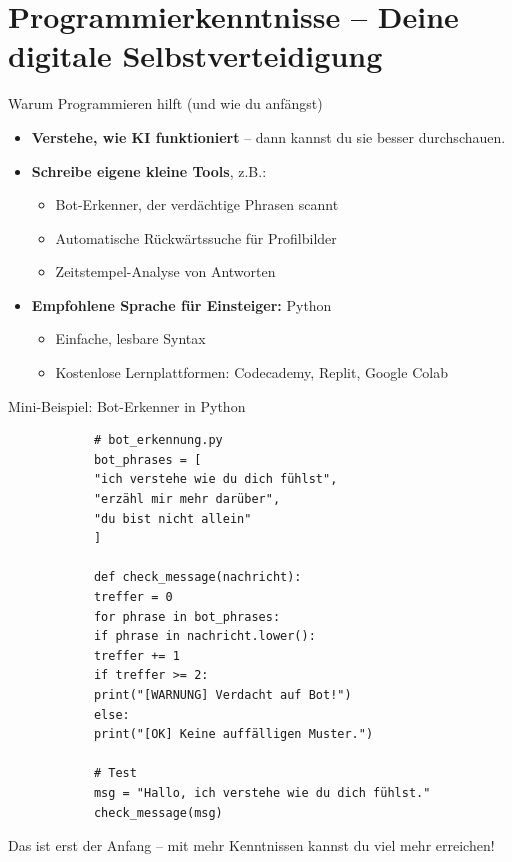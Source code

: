 \documentclass[10pt,aspectratio=169]{beamer}
\begin{document}
	\section{Programmierkenntnisse – Deine digitale Selbstverteidigung}
	\begin{frame}{Warum Programmieren hilft (und wie du anfängst)}
		\begin{itemize}
			\item \textbf{Verstehe, wie KI funktioniert} – dann kannst du sie besser durchschauen.
			\item \textbf{Schreibe eigene kleine Tools}, z.B.:
			\begin{itemize}
				\item Bot-Erkenner, der verdächtige Phrasen scannt
				\item Automatische Rückwärtssuche für Profilbilder
				\item Zeitstempel-Analyse von Antworten
			\end{itemize}
			\item \textbf{Empfohlene Sprache für Einsteiger:} \alert{Python}
			\begin{itemize}
				\item Einfache, lesbare Syntax
				\item Kostenlose Lernplattformen: Codecademy, Replit, Google Colab
			\end{itemize}
		\end{itemize}
	\end{frame}
	
	\begin{frame}[fragile]{Mini-Beispiel: Bot-Erkenner in Python}
		\begin{verbatim}
			# bot_erkennung.py
			bot_phrases = [
			"ich verstehe wie du dich fühlst",
			"erzähl mir mehr darüber",
			"du bist nicht allein"
			]
			
			def check_message(nachricht):
			treffer = 0
			for phrase in bot_phrases:
			if phrase in nachricht.lower():
			treffer += 1
			if treffer >= 2:
			print("[WARNUNG] Verdacht auf Bot!")
			else:
			print("[OK] Keine auffälligen Muster.")
			
			# Test
			msg = "Hallo, ich verstehe wie du dich fühlst."
			check_message(msg)
		\end{verbatim}
		\alert{Das ist erst der Anfang – mit mehr Kenntnissen kannst du viel mehr erreichen!}
	\end{frame}
	
\end{document}
